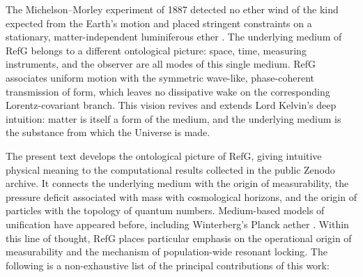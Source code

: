 \documentclass[11pt,a4paper]{article}
\begin{document}
The Michelson--Morley experiment of 1887 detected no ether wind of the kind expected from the Earth's motion and placed stringent constraints on a stationary, matter-independent luminiferous ether \citep{michelson1887}. The underlying medium of RefG belongs to a different ontological picture: space, time, measuring instruments, and the observer are all modes of this single medium. RefG associates uniform motion with the symmetric wave-like, phase-coherent transmission of form, which leaves no dissipative wake on the corresponding Lorentz-covariant branch. This vision revives and extends Lord Kelvin's deep intuition: matter is itself a form of the medium, and the underlying medium is the substance from which the Universe is made.

The present text develops the ontological picture of RefG, giving intuitive physical meaning to the computational results collected in the public Zenodo archive. It connects the underlying medium with the origin of measurability, the pressure deficit associated with mass with cosmological horizons, and the origin of particles with the topology of quantum numbers. Medium-based models of unification have appeared before, including Winterberg's Planck aether \citep{winterberg2002}. Within this line of thought, RefG places particular emphasis on the operational origin of measurability and the mechanism of population-wide resonant locking. The following is a non-exhaustive list of the principal contributions of this work:
\end{document}
